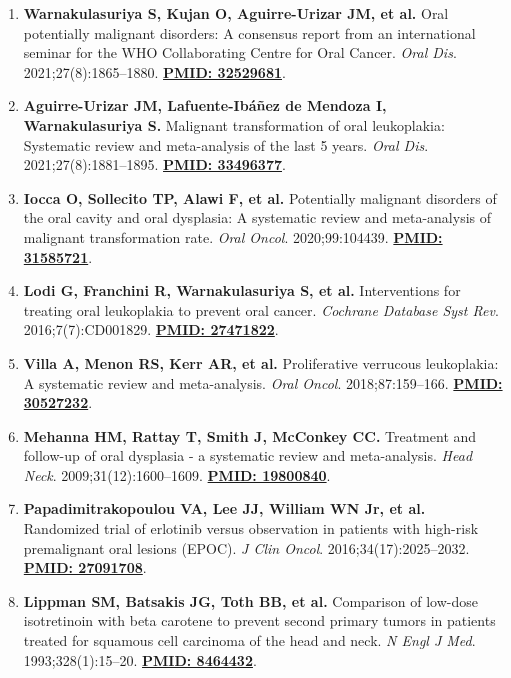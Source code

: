 \documentclass[9pt,a4paper]{article}
\begin{document}
\small
\begin{enumerate}
    \item \textbf{Warnakulasuriya S, Kujan O, Aguirre-Urizar JM, et al.} Oral potentially malignant disorders: A consensus report from an international seminar for the WHO Collaborating Centre for Oral Cancer. \textit{Oral Dis}. 2021;27(8):1865--1880. \href{https://pubmed.ncbi.nlm.nih.gov/32529681/}{\textbf{PMID: 32529681}}.
    \item \textbf{Aguirre-Urizar JM, Lafuente-Ibáñez de Mendoza I, Warnakulasuriya S.} Malignant transformation of oral leukoplakia: Systematic review and meta-analysis of the last 5 years. \textit{Oral Dis}. 2021;27(8):1881--1895. \href{https://pubmed.ncbi.nlm.nih.gov/33496377/}{\textbf{PMID: 33496377}}.
    \item \textbf{Iocca O, Sollecito TP, Alawi F, et al.} Potentially malignant disorders of the oral cavity and oral dysplasia: A systematic review and meta-analysis of malignant transformation rate. \textit{Oral Oncol}. 2020;99:104439. \href{https://pubmed.ncbi.nlm.nih.gov/31585721/}{\textbf{PMID: 31585721}}.
    \item \textbf{Lodi G, Franchini R, Warnakulasuriya S, et al.} Interventions for treating oral leukoplakia to prevent oral cancer. \textit{Cochrane Database Syst Rev}. 2016;7(7):CD001829. \href{https://pubmed.ncbi.nlm.nih.gov/27471822/}{\textbf{PMID: 27471822}}.
    \item \textbf{Villa A, Menon RS, Kerr AR, et al.} Proliferative verrucous leukoplakia: A systematic review and meta-analysis. \textit{Oral Oncol}. 2018;87:159--166. \href{https://pubmed.ncbi.nlm.nih.gov/30527232/}{\textbf{PMID: 30527232}}.
    \item \textbf{Mehanna HM, Rattay T, Smith J, McConkey CC.} Treatment and follow-up of oral dysplasia - a systematic review and meta-analysis. \textit{Head Neck}. 2009;31(12):1600--1609. \href{https://pubmed.ncbi.nlm.nih.gov/19800840/}{\textbf{PMID: 19800840}}.
    \item \textbf{Papadimitrakopoulou VA, Lee JJ, William WN Jr, et al.} Randomized trial of erlotinib versus observation in patients with high-risk premalignant oral lesions (EPOC). \textit{J Clin Oncol}. 2016;34(17):2025--2032. \href{https://pubmed.ncbi.nlm.nih.gov/27091708/}{\textbf{PMID: 27091708}}.
    \item \textbf{Lippman SM, Batsakis JG, Toth BB, et al.} Comparison of low-dose isotretinoin with beta carotene to prevent second primary tumors in patients treated for squamous cell carcinoma of the head and neck. \textit{N Engl J Med}. 1993;328(1):15--20. \href{https://pubmed.ncbi.nlm.nih.gov/8464432/}{\textbf{PMID: 8464432}}.

\end{enumerate}
\end{document}
